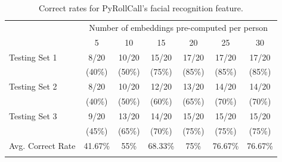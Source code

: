 \begin{table}[!htb]
\centering
\caption{Correct rates for PyRollCall's facial recognition feature.} 
\begin{tabular}{@{}lcccccc@{}}
\toprule[2pt]
& \multicolumn{6}{c}{Number of embeddings pre-computed per person}                                                                                                                              \\ \addlinespace[0.5em]
                  & 5                          & 10                         & 15                         & 20                         & 25                         & 30                         \\ \midrule \addlinespace[0.5em]
Testing Set 1     & 8/20                       & 10/20                      & 15/20                      & 17/20                      & 17/20                      & 17/20                      \\
                  & \multicolumn{1}{c}{(40\%)} & \multicolumn{1}{c}{(50\%)} & \multicolumn{1}{c}{(75\%)} & \multicolumn{1}{c}{(85\%)} & \multicolumn{1}{c}{(85\%)} & \multicolumn{1}{c}{(85\%)} \\ \addlinespace[0.5em] \midrule \addlinespace[0.5em]
Testing Set 2     & 8/20                       & 10/20                      & 12/20                      & 13/20                      & 14/20                      & 14/20                      \\
                  & \multicolumn{1}{c}{(40\%)} & \multicolumn{1}{c}{(50\%)} & \multicolumn{1}{c}{(60\%)} & \multicolumn{1}{c}{(65\%)} & \multicolumn{1}{c}{(70\%)} & \multicolumn{1}{c}{(70\%)} \\ \addlinespace[0.5em] \midrule \addlinespace[0.5em]
Testing Set 3     & 9/20                       & 13/20                      & 14/20                      & 15/20                      & 15/20                      & 15/20                      \\
                  & \multicolumn{1}{c}{(45\%)} & \multicolumn{1}{c}{(65\%)} & \multicolumn{1}{c}{(70\%)} & \multicolumn{1}{c}{(75\%)} & \multicolumn{1}{c}{(75\%)} & \multicolumn{1}{c}{(75\%)} \\ \addlinespace[0.5em] \midrule[2pt] \addlinespace[0.5em]
Avg. Correct Rate & 41.67\%                    & 55\%                       & 68.33\%                    & 75\%                       & 76.67\%                    & 76.67\%                    \\ \addlinespace[0.5em]
\bottomrule[2pt]
\end{tabular}
\label{tab:exp-result-tab}
\end{table}

